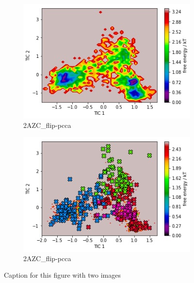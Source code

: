 \documentclass[fleqn,10pt]{wlscirep}
\begin{document}
\begin{figure}[!ht]
\centering
\begin{subfigure}{.5\textwidth}
  \centering
  \includegraphics[width=.9\linewidth]{2AZC_flip/2AZC_flip-tica.png}
  \caption{2AZC_{flip}-pcca}
  \label{fig:2AZC_flip-tica}
\end{subfigure}%
\begin{subfigure}{.5\textwidth}
  \centering
  \includegraphics[width=.9\linewidth]{2AZC_flip/2AZC_flip-pcca.png}
  \caption{2AZC_{flip}-pcca}
  \label{fig:2AZC_flip-pcca}
\end{subfigure}
\caption{Caption for this figure with two images}
\label{fig:2AZC_flip-cluster}
\end{figure}
\end{document}
